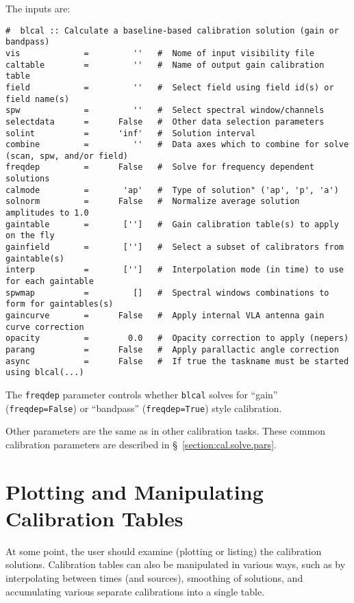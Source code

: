 The inputs are:
\small
\begin{verbatim}
#  blcal :: Calculate a baseline-based calibration solution (gain or bandpass)
vis             =         ''   #  Nome of input visibility file
caltable        =         ''   #  Name of output gain calibration table
field           =         ''   #  Select field using field id(s) or field name(s)
spw             =         ''   #  Select spectral window/channels
selectdata      =      False   #  Other data selection parameters
solint          =      'inf'   #  Solution interval
combine         =         ''   #  Data axes which to combine for solve (scan, spw, and/or field)
freqdep         =      False   #  Solve for frequency dependent solutions
calmode         =       'ap'   #  Type of solution" ('ap', 'p', 'a')
solnorm         =      False   #  Normalize average solution amplitudes to 1.0
gaintable       =       ['']   #  Gain calibration table(s) to apply on the fly
gainfield       =       ['']   #  Select a subset of calibrators from gaintable(s)
interp          =       ['']   #  Interpolation mode (in time) to use for each gaintable
spwmap          =         []   #  Spectral windows combinations to form for gaintables(s)
gaincurve       =      False   #  Apply internal VLA antenna gain curve correction
opacity         =        0.0   #  Opacity correction to apply (nepers)
parang          =      False   #  Apply parallactic angle correction
async           =      False   #  If true the taskname must be started using blcal(...)
\end{verbatim}
\normalsize

The {\tt freqdep} parameter controls whether {\tt blcal} solves for 
``gain'' ({\tt freqdep=False}) or ``bandpass'' ({\tt freqdep=True})
style calibration.

Other parameters are the same as in other calibration tasks.
These common calibration parameters are described in
\S~\ref{section:cal.solve.pars}.

\section{Plotting and Manipulating Calibration Tables}
\label{section:cal.tables}

At some point, the user should examine (plotting or listing) the
calibration solutions.
Calibration tables can also be manipulated in various ways, such as
by interpolating between times (and sources), smoothing of solutions,
and accumulating various separate calibrations into a single 
table.

